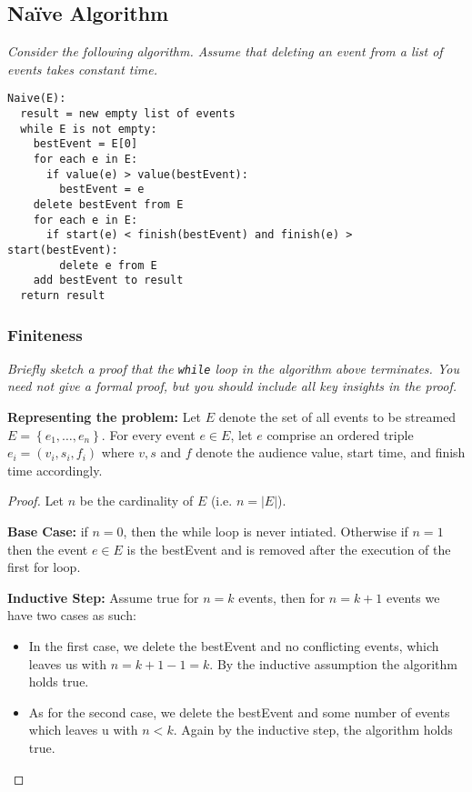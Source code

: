 \documentclass[11pt, oneside]{article}   	%
\theoremstyle{definition}
\theoremstyle{remark}
\begin{document}
\subsection{Na\"ive Algorithm}
\textit{Consider the following algorithm. Assume that deleting an event from a list of events takes constant time.}
\begin{verbatim}
Naive(E):
  result = new empty list of events
  while E is not empty:
    bestEvent = E[0]
    for each e in E:
      if value(e) > value(bestEvent):
        bestEvent = e
    delete bestEvent from E
    for each e in E:
      if start(e) < finish(bestEvent) and finish(e) > start(bestEvent):
        delete e from E
    add bestEvent to result
  return result
\end{verbatim}

\subsubsection{Finiteness}
\textit{Briefly sketch a proof that the \texttt{while} loop in the algorithm above terminates. You need not give a formal proof, but you should include all key insights in the proof.}

\textbf{Representing the problem:} Let $E$ denote the set of all events to be streamed $E=\left\{e_1, \ldots, e_n\right\}$. For every event $e \in E$, let $e$ comprise an ordered triple $e_i = (v_i, s_i, f_i)$ where $v,s$ and $f$ denote the audience value, start time, and finish time accordingly.

\begin{proof}
Let $n$ be the cardinality of $E$ (i.e. $n=|E|$).

\textbf{Base Case:} if $n = 0$, then the while loop is never intiated.
Otherwise if $n=1$ then the event $e \in E$ is the bestEvent and is removed after the execution of the first for loop. 

\textbf{Inductive Step:} Assume true for $n=k$ events, then for $n=k+1$ events we have two cases as such:
\begin{itemize}
	\item In the first case, we delete the bestEvent and no conflicting events, which leaves us with $n=k+1-1=k$. By the inductive assumption the algorithm holds true.
	\item As for the second case, we delete the bestEvent and some number of events which leaves u with $n<k$. Again by the inductive step, the algorithm holds true.
\end{itemize} 
\end{proof}
\end{document}
